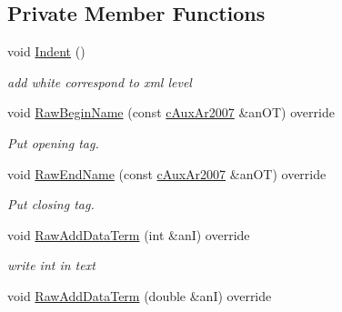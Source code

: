 \subsection*{Private Member Functions}
\begin{DoxyCompactItemize}
\item 
void \hyperlink{classMMVII_1_1cOXml__Ar2007_a4d6ada5bc85844fadd321775414c992a}{Indent} ()\hypertarget{classMMVII_1_1cOXml__Ar2007_a4d6ada5bc85844fadd321775414c992a}{}\label{classMMVII_1_1cOXml__Ar2007_a4d6ada5bc85844fadd321775414c992a}

\begin{DoxyCompactList}\small\item\em add white correspond to xml level \end{DoxyCompactList}\item 
void \hyperlink{classMMVII_1_1cOXml__Ar2007_a108fa8c2e421cc54292c9130f0fb9b58}{Raw\+Begin\+Name} (const \hyperlink{classMMVII_1_1cAuxAr2007}{c\+Aux\+Ar2007} \&an\+OT) override\hypertarget{classMMVII_1_1cOXml__Ar2007_a108fa8c2e421cc54292c9130f0fb9b58}{}\label{classMMVII_1_1cOXml__Ar2007_a108fa8c2e421cc54292c9130f0fb9b58}

\begin{DoxyCompactList}\small\item\em Put opening tag. \end{DoxyCompactList}\item 
void \hyperlink{classMMVII_1_1cOXml__Ar2007_a90d59b9504b16d47c39e9b8c5ddb20bd}{Raw\+End\+Name} (const \hyperlink{classMMVII_1_1cAuxAr2007}{c\+Aux\+Ar2007} \&an\+OT) override\hypertarget{classMMVII_1_1cOXml__Ar2007_a90d59b9504b16d47c39e9b8c5ddb20bd}{}\label{classMMVII_1_1cOXml__Ar2007_a90d59b9504b16d47c39e9b8c5ddb20bd}

\begin{DoxyCompactList}\small\item\em Put closing tag. \end{DoxyCompactList}\item 
void \hyperlink{classMMVII_1_1cOXml__Ar2007_a00378c9dd4daa9fdc8675665fb93ada9}{Raw\+Add\+Data\+Term} (int \&anI) override\hypertarget{classMMVII_1_1cOXml__Ar2007_a00378c9dd4daa9fdc8675665fb93ada9}{}\label{classMMVII_1_1cOXml__Ar2007_a00378c9dd4daa9fdc8675665fb93ada9}

\begin{DoxyCompactList}\small\item\em write int in text \end{DoxyCompactList}\item 
void \hyperlink{classMMVII_1_1cOXml__Ar2007_aa57b5f1bb9a64a122006512dd65e9153}{Raw\+Add\+Data\+Term} (double \&anI) override\hypertarget{classMMVII_1_1cOXml__Ar2007_aa57b5f1bb9a64a122006512dd65e9153}{}\label{classMMVII_1_1cOXml__Ar2007_aa57b5f1bb9a64a122006512dd65e9153}


\end{DoxyCompactItemize}
